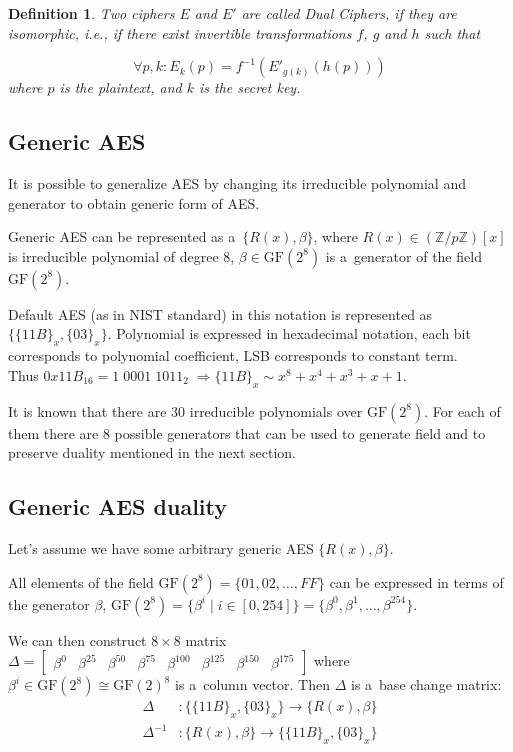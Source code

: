 \documentclass[11pt,oneside,final]{fithesis2}
\newtheorem{mydef}{Definition}
\newcommand{\gfe}{\ensuremath{\text{GF}\left(2^8\right)}}
\begin{document}
	\begin{mydef}\label{def:dual_cipher}
	Two ciphers $E$ and $E'$ are called Dual Ciphers, if they are
	isomorphic, i.e., if there exist invertible transformations $f$, $g$ and $h$ such
	that

	\begin{equation} 
	\forall p, k: E_k(p) = f^{-1}\left(E'_{g(k)}(h(p))\right)
	\end{equation}
	where $p$ is the plaintext, and $k$ is the secret key.
	\end{mydef}

	\subsection{Generic AES}\label{sec:genericAES}
	It is possible to generalize AES by changing its irreducible polynomial and generator to obtain generic form of AES.

	Generic AES can be represented as a~$\{R(x), \beta \}$, where $R(x) \in \left(\mathbb{Z}/p\mathbb{Z}\right)[x]$ is 
	irreducible polynomial of degree 8, $\beta \in \gfe$ is a~generator of the field $\gfe$.

	Default AES (as in NIST standard) in this notation is represented as $\{\{11B\}_x, \{03\}_x\}$. Polynomial is expressed
	in hexadecimal notation, each bit corresponds to polynomial coefficient, LSB corresponds to constant term.\\
	Thus $0x11B_{16} = 1 \; 0001 \; 1011_{2} \; \Rightarrow \{11B\}_x \sim x^8+x^4+x^3+x+1$.

	It is known that there are $30$ irreducible polynomials over $\gfe$. For each of them there are $8$ possible
	generators that can be used to generate field and to preserve duality mentioned in the next section.

	\subsection{Generic AES duality}
	Let's assume we have some arbitrary generic AES $\{R(x), \beta \}$. 

	All elements of the field $\gfe = \{01, 02, \dots, FF\}$
	can be expressed in terms of the generator $\beta$, $\gfe = \{\beta^i \; | \; i \in [0,254]\} = \{\beta^0, \beta^1, \dots, \beta^{254}\}$.

	We can then construct $8 \times 8$ matrix $\Delta = \begin{bmatrix} \beta^0 & \beta^{25} & \beta^{50} & \beta^{75} & \beta^{100} & \beta^{125} & \beta^{150} & \beta^{175}  \end{bmatrix}$ where 
	$\beta^i \in \gfe \cong \text{GF}(2)^8$ is a~column vector. Then $\Delta$ is a~base change matrix:
	\begin{subequations}
	\begin{align}
	    \Delta &: \{\{11B\}_x, \{03\}_x\}  \longrightarrow \{R(x), \beta \} \\
	    \Delta^{-1} &: \{R(x), \beta \}  \longrightarrow \{\{11B\}_x, \{03\}_x\}
	\end{align}
	\end{subequations}
\end{document}
